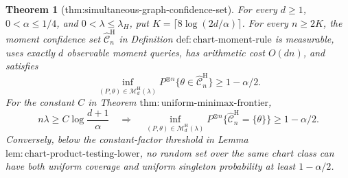 \documentclass{article}
\newtheorem{theorem}{Theorem}
\begin{document}
\begin{theorem}[thm:simultaneous-graph-confidence-set]\label{thm:simultaneous-graph-confidence-set}
For every \(d\ge1\), \(0<\alpha\le1/4\), and \(0<\lambda\le\lambda_H\), put \(K=\lceil8\log(2d/\alpha)\rceil\).  For every \(n\ge2K\), the moment confidence set \(\widehat{\mathcal C}_n^{\mathrm H}\) in Definition \(\mathrm{def:chart\text{-}moment\text{-}rule}\) is measurable, uses exactly \(d\) observable moment queries, has arithmetic cost \(O(dn)\), and satisfies
\[
\inf_{(P,\theta)\in\mathcal M_d^{\mathrm H}(\lambda)}
P^{\otimes n}\{\theta\in\widehat{\mathcal C}_n^{\mathrm H}\}
\ge1-\alpha/2.
\]
For the constant \(C\) in Theorem \(\mathrm{thm:uniform\text{-}minimax\text{-}frontier}\),
\[
n\lambda\ge C\log\frac{d+1}{\alpha}
\quad\Longrightarrow\quad
\inf_{(P,\theta)\in\mathcal M_d^{\mathrm H}(\lambda)}
P^{\otimes n}\{\widehat{\mathcal C}_n^{\mathrm H}=\{\theta\}\}
\ge1-\alpha/2.
\]
Conversely, below the constant-factor threshold in Lemma \(\mathrm{lem:chart\text{-}product\text{-}testing\text{-}lower}\), no random set over the same chart class can have both uniform coverage and uniform singleton probability at least \(1-\alpha/2\).
\end{theorem}
\end{document}
